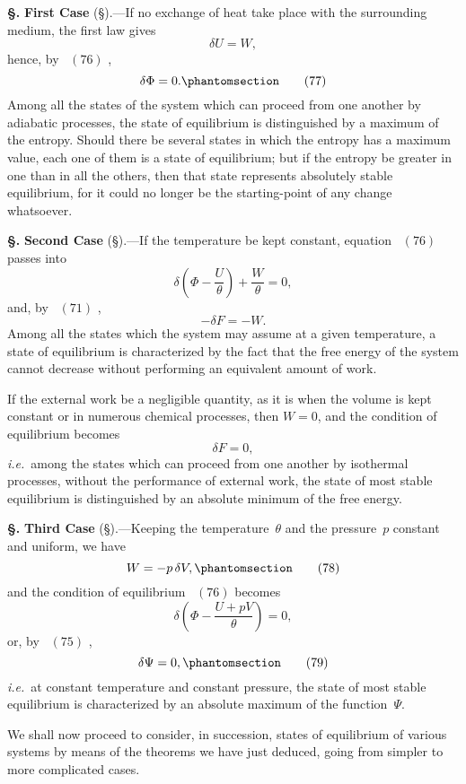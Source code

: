\documentclass[12pt]{book}[2005/09/16]
\newcommand{\Chg}[2]{#2}
\newcommand{\Add}[1]{\Chg{}{#1}}
\newcommand{\Section}[1]{
  \medskip\par\textbf{§\;#1}
  \label{section:#1}
}
\newcommand{\SecRef}[2][§\;]{\hyperref[section:#2.]{{\upshape #1#2}}}
\newcommand{\Tag}[1]{%
  \phantomsection\label{eqn:#1}\tag*{\ensuremath{#1}}%
}
\newcommand{\Eq}[1]{%
  \hyperref[eqn:#1]{\ensuremath{#1}}%
}
\newcommand{\PageSep}[1]{\ignorespaces}
\newcommand{\Topic}[1]{\textbf{#1}}
\newcommand{\ie}{\emph{i.e.}}
\begin{document}
\Section{150.} \Topic{First Case} (\SecRef{141}).---If no exchange of heat take
place with the surrounding medium, the first law gives
\[
\delta U = W,
\]
hence, by~\Eq{(76)},
\[
\delta \Phi = 0\Add{.}
\Tag{(77)}
\]
Among all the states of the system which can proceed from
one another by adiabatic processes, the state of equilibrium
is distinguished by a maximum of the entropy. Should
%
%
%
there be several states in which the entropy has a maximum
value, each one of them is a state of equilibrium; but if
the entropy be greater in one than in all the others, then
that state represents absolutely stable equilibrium, for it
could no longer be the starting-point of any change whatsoever.

\Section{151.} \Topic{Second Case} (\SecRef{142}).---If the temperature be
kept constant, equation~\Eq{(76)} passes into
\[
\delta\left(\Phi - \frac{U}{\theta}\right) + \frac{W}{\theta} = 0,
\]
and, by~\Eq{(71)},
\[
- \delta F = -W.
\]
Among all the states which the system may assume at a
given temperature, a state of equilibrium is characterized
by the fact that the free energy of the system cannot
%
decrease without performing an equivalent amount of work.

If the external work be a negligible quantity, as it is
when the volume is kept constant or in numerous chemical
processes, then $W = 0$, and the condition of equilibrium
becomes
\[
\delta F = 0,
\]
\ie\ among the states which can proceed from one another
by isothermal processes, without the performance of external
work, the state of most stable equilibrium is distinguished
by an absolute minimum of the free energy.
\PageSep{118}

\Section{152.} \Topic{Third Case} (\SecRef{147}).---Keeping the temperature~$\theta$
%
and the pressure~$p$ constant and uniform, we have
\[
W = -p\, \delta V,
\Tag{(78)}
\]
and the condition of equilibrium~\Eq{(76)} becomes
\[
\delta\left(\Phi - \frac{U + pV}{\theta}\right) = 0,
\]
or, by~\Eq{(75)},
\[
\delta\Psi = 0\Add{,}
\Tag{(79)}
\]
\ie\ at constant temperature and constant pressure, the state
of most stable equilibrium is characterized by an absolute
maximum of the function~$\Psi$.

We shall now proceed to consider, in succession, states
of equilibrium of various systems by means of the theorems
we have just deduced, going from simpler to more complicated
cases.
\PageSep{119}
\end{document}
